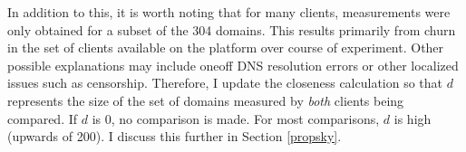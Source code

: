 In addition to this, it is worth noting that for many clients, measurements were only obtained for
a subset of the 304 domains. This results primarily from churn in the set of clients available on
the platform over course of experiment. Other possible explanations may include oneoff DNS
resolution errors or other localized issues such as censorship. Therefore, I update the closeness
calculation so that $d$ represents the size of the set of domains measured by \emph{both} clients
being compared. If $d$ is 0, no comparison is made. For most comparisons, $d$ is high (upwards of
200). I discuss this further in Section \ref{propsky}.


